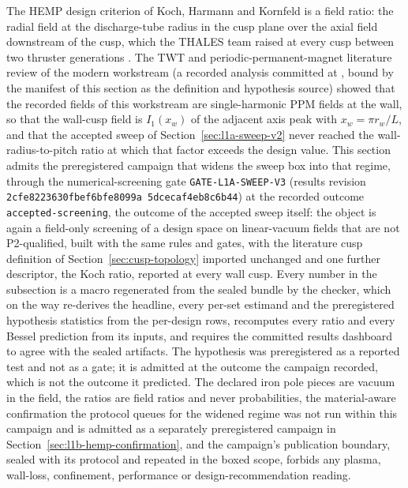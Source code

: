 \documentclass[11pt]{article}
\newcommand{\SweepThreeEvidenceRevision}{\texttt{2cfe8223\allowbreak{}630fbef6\allowbreak{}bfe8099a\allowbreak{}%
5dcecaf4\allowbreak{}eb8c6b44}}
\begin{document}
The HEMP design criterion of Koch, Harmann and Kornfeld is a field ratio: the
radial field at the discharge-tube radius in the cusp plane over the axial field
downstream of the cusp, which the THALES team raised at every cusp between two
thruster generations \cite{Koch2007}. The TWT and periodic-permanent-magnet
literature review of the modern workstream (a recorded analysis committed at
\texttt{\SwtLiteratureCommit}, bound by the manifest of this section as the
definition and hypothesis source) showed that the recorded fields of this
workstream are single-harmonic PPM fields at the wall, so that the wall-cusp field
is $I_1(x_w)$ of the adjacent axis peak with $x_w = \pi r_w/L$, and that the
accepted sweep of Section~\ref{sec:l1a-sweep-v2} never reached the
wall-radius-to-pitch ratio at which that factor exceeds the design value. This
section admits the preregistered campaign that widens the sweep box into that
regime, through the numerical-screening gate \texttt{GATE-L1A-SWEEP-V3} (results
revision \SweepThreeEvidenceRevision) at the recorded outcome
\texttt{accepted-screening}, the outcome of the accepted sweep itself: the object
is again a field-only screening of a design space on linear-vacuum fields that are
not P2-qualified, built with the same rules and gates, with the literature cusp
definition of Section~\ref{sec:cusp-topology} imported unchanged and one further
descriptor, the Koch ratio, reported at every wall cusp. Every number in the
subsection is a macro regenerated from the sealed bundle by the checker, which on
the way re-derives the headline, every per-set estimand and the preregistered
hypothesis statistics from the per-design rows, recomputes every ratio and every
Bessel prediction from its inputs, and requires the committed results dashboard to
agree with the sealed artifacts. The hypothesis was preregistered as a reported
test and not as a gate; it is admitted at the outcome the campaign recorded, which
is not the outcome it predicted. The declared iron pole pieces are vacuum in the
field, the ratios are field ratios and never probabilities, the material-aware
confirmation the protocol queues for the widened regime was not run within this
campaign and is admitted as a separately preregistered campaign in
Section~\ref{sec:l1b-hemp-confirmation}, and the
campaign's publication boundary, sealed with its protocol and repeated in the boxed
scope, forbids any plasma, wall-loss, confinement, performance or design-recommendation
reading.


\end{document}
